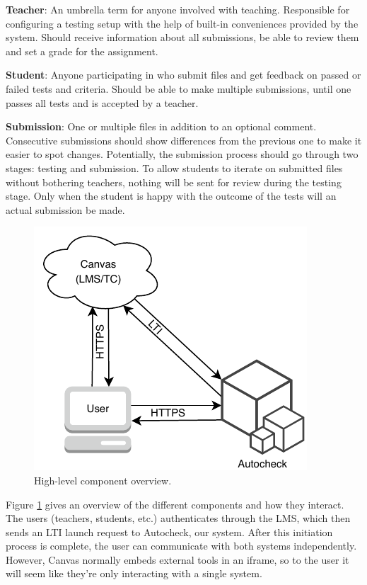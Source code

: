 \textbf{Teacher}: An umbrella term for anyone involved with teaching. Responsible for configuring a testing setup with the help of built-in conveniences provided by the system. Should receive information about all submissions, be able to review them and set a grade for the assignment.

\textbf{Student}: Anyone participating in who submit files and get feedback on passed or failed tests and criteria. Should be able to make multiple submissions, until one passes all tests and is accepted by a teacher.

\textbf{Submission}: One or multiple files in addition to an optional comment. Consecutive submissions should show differences from the previous one to make it easier to spot changes. Potentially, the submission process should go through two stages: testing and submission. To allow students to iterate on submitted files without bothering teachers, nothing will be sent for review during the testing stage. Only when the student is happy with the outcome of the tests will an actual submission be made.      

\begin{figure}
    \centering
    \includegraphics{figure/Infrastructure_overview.pdf}
    \caption{High-level component overview.}
    \label{fig:communication_overview}
\end{figure}

Figure \ref{fig:communication_overview} gives an overview of the different components and how they interact. The users (teachers, students, etc.) authenticates through the LMS, which then sends an LTI launch request to Autocheck, our system. After this initiation process is complete, the user can communicate with both systems independently. However, Canvas normally embeds external tools in an iframe, so to the user it will seem like they're only interacting with a single system.

